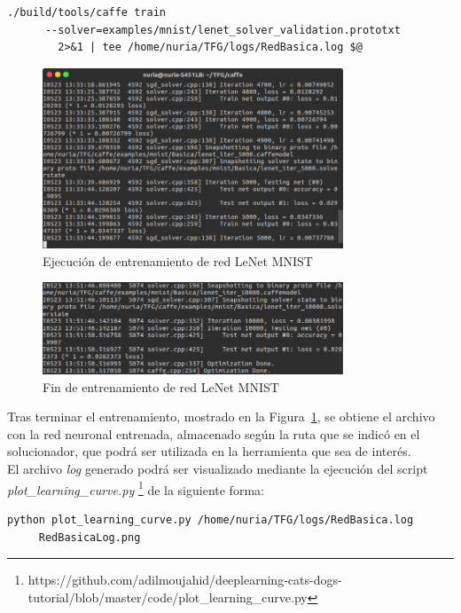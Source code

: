 \begin{description}
\begin{lstlisting}[frame=single]
	./build/tools/caffe train 
	  --solver=examples/mnist/lenet_solver_validation.prototxt 
	    2>&1 | tee /home/nuria/TFG/logs/RedBasica.log $@
	\end{lstlisting}
	
	\begin{figure}[h!]
		\begin{center}
			\includegraphics[width=0.8\textwidth]{figures/RedBasica5000}
			\caption{Ejecución de entrenamiento de red LeNet MNIST}
		\end{center}
	\end{figure}
	
	\begin{figure}[h!]
		\begin{center}
			\includegraphics[width=0.8\textwidth]{figures/RedBasicaFin}
			\caption{Fin de entrenamiento de red LeNet MNIST}
			\label{fig.finEntrBas}
		\end{center}
	\end{figure}
	\vspace{50pt}
	Tras terminar el entrenamiento, mostrado en la Figura~\ref{fig.finEntrBas}, se obtiene el archivo con la red neuronal entrenada, almacenado según la ruta que se indicó en el solucionador, que podrá ser utilizada en la herramienta que sea de interés.\\
	
	El archivo \textit{log} generado podrá ser visualizado mediante la ejecución del script \textit{plot\_learning\_curve.py} \footnote{https://github.com/adilmoujahid/deeplearning-cats-dogs-tutorial/blob/master/code/plot\_learning\_curve.py} de la siguiente forma:
	\vspace{5pt}
	\begin{lstlisting}[frame=single]
	python plot_learning_curve.py /home/nuria/TFG/logs/RedBasica.log 
	 RedBasicaLog.png
	\end{lstlisting}
	

\end{description}
